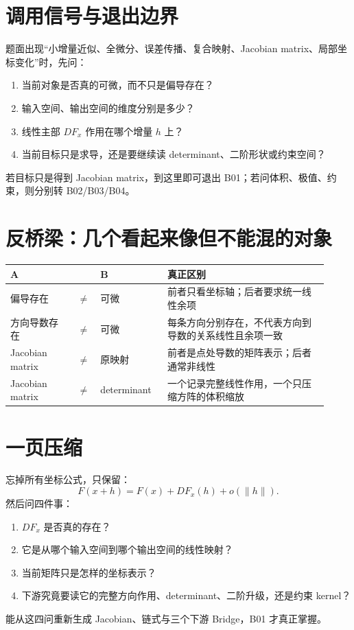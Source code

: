 \documentclass[profile=standard]{ipara-handbook}
\begin{document}
\section{调用信号与退出边界}
题面出现“小增量近似、全微分、误差传播、复合映射、Jacobian matrix、局部坐标变化”时，先问：
\begin{enumerate}
\item 当前对象是否真的可微，而不只是偏导存在？
\item 输入空间、输出空间的维度分别是多少？
\item 线性主部 $DF_x$ 作用在哪个增量 $h$ 上？
\item 当前目标只是求导，还是要继续读 determinant、二阶形状或约束空间？
\end{enumerate}
若目标只是得到 Jacobian matrix，到这里即可退出 B01；若问体积、极值、约束，则分别转 B02/B03/B04。

\section{反桥梁：几个看起来像但不能混的对象}
\begin{tabular}{p{0.2\linewidth}p{0.04\linewidth}p{0.2\linewidth}p{0.48\linewidth}}
\hline
A & & B & 真正区别\\
\hline
偏导存在 & $\neq$ & 可微 & 前者只看坐标轴；后者要求统一线性余项\\
方向导数存在 & $\neq$ & 可微 & 每条方向分别存在，不代表方向到导数的关系线性且余项一致\\
Jacobian matrix & $\neq$ & 原映射 & 前者是点处导数的矩阵表示；后者通常非线性\\
Jacobian matrix & $\neq$ & determinant & 一个记录完整线性作用，一个只压缩方阵的体积缩放\\
\hline
\end{tabular}

\section{一页压缩}
忘掉所有坐标公式，只保留：
\[
\boxed{F(x+h)=F(x)+DF_x(h)+o(\lVert h\rVert)}.
\]
然后问四件事：
\begin{enumerate}
\item $DF_x$ 是否真的存在？
\item 它是从哪个输入空间到哪个输出空间的线性映射？
\item 当前矩阵只是怎样的坐标表示？
\item 下游究竟要读它的完整方向作用、determinant、二阶升级，还是约束 kernel？
\end{enumerate}
能从这四问重新生成 Jacobian、链式与三个下游 Bridge，B01 才真正掌握。
\end{document}
